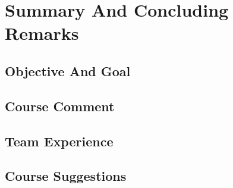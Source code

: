 

\chapter{Summary And Concluding Remarks}

\section{Objective And Goal}


\section{Course Comment}


\section{Team Experience}


\section{Course Suggestions}

